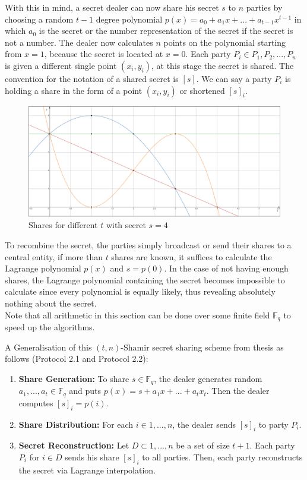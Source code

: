 With this in mind, a secret dealer can now share his secret $s$ to $n$ parties by choosing a random $t-1$ degree polynomial $p(x)=a_{0} + a_{1}x + ... + a_{t-1}x^{t-1}$ in which $a_{0}$ is the secret or the number representation of the secret if the secret is not a number. The dealer now calculates $n$ points on the polynomial starting from $x=1$, because the secret is located at $x=0$. Each party $P_i \in {P_1, P_2, ..., P_n}$ is given a different single point $(x_i,y_i)$, at this stage the secret is shared. The convention for the notation of a shared secret is $[s]$. We can say a party $P_i$ is holding a share in the form of a point $(x_i,y_i)$ or shortened $[s]_i$.


\begin{figure}
  \includegraphics[width=\linewidth]{plots/secretsharing_big.png}
  \caption{Shares for different $t$ with secret $s=4$}
  \label{fig:secretsharing}
\end{figure}

To recombine the secret, the parties simply broadcast or send their shares to a central entity, if more than $t$ shares are known, it suffices to calculate the Lagrange polynomial $p(x)$ and $s=p(0)$. In the case of not having enough shares, the Lagrange polynomial containing the secret becomes impossible to calculate since every polynomial is equally likely, thus revealing absolutely nothing about the secret.\\

Note that all arithmetic in this section can be done over some finite field $\mathbb{F}_q$ to speed up the algorithms.

A Generalisation of this $(t,n)$-Shamir secret sharing scheme from thesis \cite{de2012design} as follows (Protocol 2.1 and Protocol 2.2):
\begin{enumerate}
  \item \textbf{Share Generation:} To share $s \in \mathbb{F}_q$, the dealer generates random $a_1, ..., a_t \in \mathbb{F}_q$ and puts $p(x) = s + a_1x + ... + a_tx_t$. Then the dealer computes $[s]_i = p(i)$.
  \item \textbf{Share Distribution:} For each $i \in {1, ..., n}$, the dealer sends $[s]_i$ to party $P_i$.
  \item \textbf{Secret Reconstruction:} Let $D \subset {1, ..., n}$ be a set of size $t + 1$. Each party $P_i$ for $i \in D$ sends his share $[s]_i$ to all parties. Then, each party reconstructs the secret via Lagrange interpolation.
\end{enumerate}

